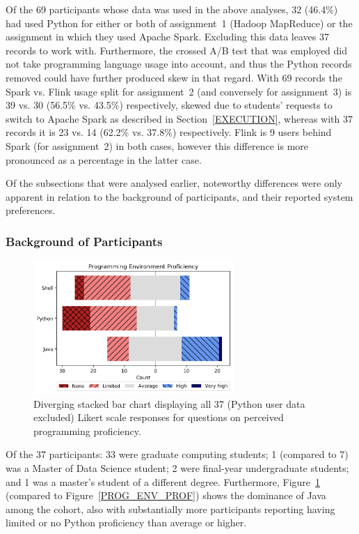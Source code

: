   Of the 69 participants whose data was used in the above analyses, 32 (46.4\%) had used Python for either or both of assignment~1 (Hadoop MapReduce) or the assignment in which they used Apache Spark. Excluding this data leaves 37 records to work with. Furthermore, the crossed A/B test that was employed did not take programming language usage into account, and thus the Python records removed could have further produced skew in that regard. With 69 records the Spark vs. Flink usage split for assignment~2 (and conversely for assignment~3) is 39 vs. 30 (56.5\% vs. 43.5\%) respectively, skewed due to students' requests to switch to Apache Spark as described in Section~\ref{EXECUTION}, whereas with 37 records it is 23 vs. 14 (62.2\% vs. 37.8\%) respectively. Flink is 9 users behind Spark (for assignment~2) in both cases, however this difference is more pronounced as a percentage in the latter case.
  
  Of the subsections that were analysed earlier, noteworthy differences were only apparent in relation to the background of participants, and their reported system preferences.
  
\subsubsection{Background of Participants}
  
  \begin{figure}[ht]
    \centering
    \includegraphics[width=3in]{./figs/nopy-programming-environment-proficiency.png}
    \caption{Diverging stacked bar chart \cite{HEIBERGER:DSBC:2014} displaying all 37 (Python user data excluded) Likert scale responses for questions on perceived programming proficiency.}
    \label{NOPY_PROG_ENV_PROF}
  \end{figure}

  Of the 37 participants: 33 were graduate computing students; 1 (compared to 7) was a Master of Data Science student; 2 were final-year undergraduate students; and 1 was a master's student of a different degree. Furthermore, Figure~\ref{NOPY_PROG_ENV_PROF} (compared to Figure~\ref{PROG_ENV_PROF}) shows the dominance of Java among the cohort, also with substantially more participants reporting having limited or no Python proficiency than average or higher.
  
